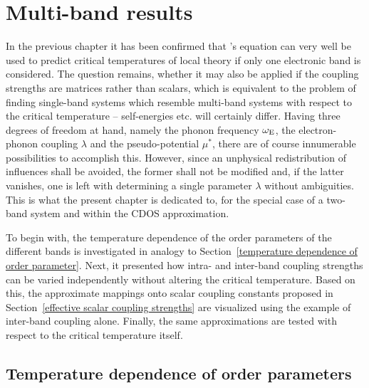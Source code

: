 
\chapter{Multi-band results}
\label{multi-band results}

In the previous chapter it has been confirmed that 's equation
can very well be used to predict critical temperatures of local
 theory if only one electronic band is considered. The question
remains, whether it may also be applied if the coupling strengths are matrices
rather than scalars, which is equivalent to the problem of finding single-band
systems which resemble multi-band systems with respect to the critical
temperature -- self-energies etc. will certainly differ. Having three degrees of
freedom at hand, namely the phonon frequency $\omega \sb{\text{E}}$, the
electron-phonon coupling $\lambda$ and the  pseudo-potential
$\mu^*$, there are of course innumerable possibilities to accomplish this.
However, since an unphysical redistribution of influences shall be avoided, the
former shall not be modified and, if the latter vanishes, one is left with
determining a single parameter $\lambda$ without ambiguities. This is what the
present chapter is dedicated to, for the special case of a two-band system and
within the CDOS approximation.

To begin with, the temperature dependence of the order parameters of the
different bands is investigated in analogy to Section~\ref{temperature
dependence of order parameter}. Next, it presented how intra- and inter-band
coupling strengths can be varied independently without altering the critical
temperature. Based on this, the approximate mappings onto scalar coupling
constants proposed in Section~\ref{effective scalar coupling strengths} are
visualized using the example of inter-band coupling alone. Finally, the same
approximations are tested with respect to the critical temperature itself.

\section{Temperature dependence of order parameters}
\label{temperature dependence of order parameters}

